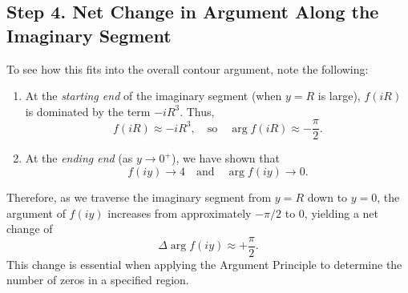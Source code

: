 \documentclass[12pt]{article}
\theoremstyle{definition} %
\theoremstyle{plain} %
\begin{document}
\subsection*{Step 4. Net Change in Argument Along the Imaginary Segment}
To see how this fits into the overall contour argument, note the following:
\begin{enumerate}
    \item At the \emph{starting end} of the imaginary segment (when \(y = R\) is large), 
          \(f(iR)\) is dominated by the term \(-iR^3\). Thus,
          \[
              f(iR) \approx -iR^3, \quad \text{so} \quad \arg f(iR) \approx -\frac{\pi}{2}.
          \]
    \item At the \emph{ending end} (as \(y \to 0^+\)), we have shown that 
          \[
             f(iy) \to 4 \quad \text{and} \quad \arg f(iy) \to 0.
          \]
\end{enumerate}
Therefore, as we traverse the imaginary segment from \(y=R\) down to \(y=0\), the argument of \(f(iy)\) increases from approximately \(-\pi/2\) to \(0\), yielding a net change of
\[
    \Delta \arg f(iy) \approx +\frac{\pi}{2}.
\]
This change is essential when applying the Argument Principle to determine the number of zeros in a specified region.
\end{document}
